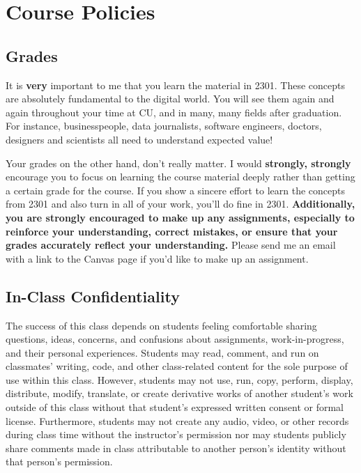 \documentclass[10pt]{memoir}
\begin{document}
\clearpage

\section{\textbf{Course Policies}}


\subsection{Grades}
It is \textbf{very} important to me that you learn the material in 2301. These concepts are absolutely fundamental to the digital world. You will see them again and again throughout your time at CU, and in many, many fields after graduation. For instance, businesspeople, data journalists, software engineers, doctors, designers and scientists all need to understand expected value! 

Your grades on the other hand, don't really matter. I would \textbf{strongly, strongly} encourage you to focus on learning the course material deeply rather than getting a certain grade for the course. If you show a sincere effort to learn the concepts from 2301 and also turn in all of your work, you'll do fine in 2301. \textbf{Additionally, you are strongly encouraged to make up any assignments, especially to reinforce your understanding, correct mistakes, or ensure that your grades accurately reflect your understanding.} Please send me an email with a link to the Canvas page if you'd like to make up an assignment.

\subsection{In-Class Confidentiality}
The success of this class depends on students feeling comfortable sharing questions, ideas, concerns, and confusions about assignments, work-in-progress, and their personal experiences. Students may read, comment, and run on classmates' writing, code, and other class-related content for the sole purpose of use within this class. However, students may not use, run, copy, perform, display, distribute, modify, translate, or create derivative works of another student's work outside of this class without that student's expressed written consent or formal license. Furthermore, students may not create any audio, video, or other records during class time without the instructor's permission nor may students publicly share comments made in class attributable to another person's identity without that person's permission.
\end{document}
